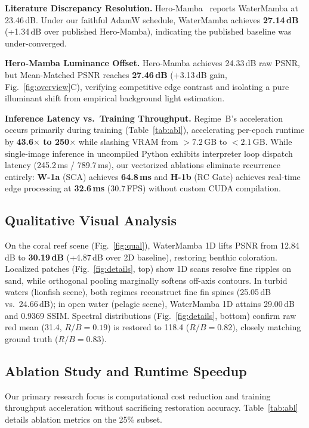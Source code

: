 \documentclass[conference]{IEEEtran}
\begin{document}
	\textbf{Literature Discrepancy Resolution.} Hero-Mamba~\cite{hm} reports WaterMamba at 23.46\,dB. Under our faithful AdamW schedule, WaterMamba achieves \textbf{27.14\,dB} (+1.34\,dB over published Hero-Mamba), indicating the published baseline was under-converged.
	
	\textbf{Hero-Mamba Luminance Offset.} Hero-Mamba achieves 24.33\,dB raw PSNR, but Mean-Matched PSNR reaches \textbf{27.46\,dB} (+3.13\,dB gain, Fig.~\ref{fig:overview}C), verifying competitive edge contrast and isolating a pure illuminant shift from empirical background light estimation.
	
	\textbf{Inference Latency vs.\ Training Throughput.} Regime~B's acceleration occurs primarily during training (Table~\ref{tab:abl}), accelerating per-epoch runtime by \textbf{43.6$\times$ to 250$\times$} while slashing VRAM from $>7.2$\,GB to $<2.1$\,GB. While single-image inference in uncompiled Python exhibits interpreter loop dispatch latency (245.2\,ms / 789.7\,ms), our vectorized ablations eliminate recurrence entirely: \textbf{W-1a} (SCA) achieves \textbf{64.8\,ms} and \textbf{H-1b} (RC Gate) achieves real-time edge processing at \textbf{32.6\,ms} (30.7\,FPS) without custom CUDA compilation.
	
	\subsection{Qualitative Visual Analysis}
	On the coral reef scene (Fig.~\ref{fig:qual}), WaterMamba 1D lifts PSNR from 12.84\,dB to \textbf{30.19\,dB} (+4.87\,dB over 2D baseline), restoring benthic coloration. Localized patches (Fig.~\ref{fig:details}, top) show 1D scans resolve fine ripples on sand, while orthogonal pooling marginally softens off-axis contours. In turbid waters (lionfish scene), both regimes reconstruct fine fin spines (25.05\,dB vs.\ 24.66\,dB); in open water (pelagic scene), WaterMamba 1D attains 29.00\,dB and 0.9369 SSIM. Spectral distributions (Fig.~\ref{fig:details}, bottom) confirm raw red mean (31.4, $R/B=0.19$) is restored to 118.4 ($R/B=0.82$), closely matching ground truth ($R/B=0.83$).
	
	\subsection{Ablation Study and Runtime Speedup}
	Our primary research focus is computational cost reduction and training throughput acceleration without sacrificing restoration accuracy. Table~\ref{tab:abl} details ablation metrics on the 25\% subset.
	
\end{document}
